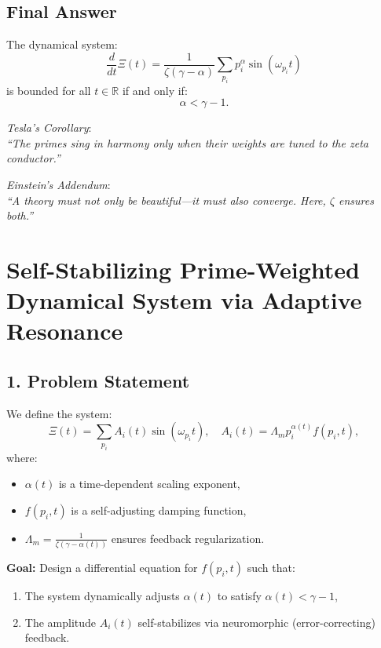 \documentclass{article}
\theoremstyle{plain}
\theoremstyle{claimstyle}
\begin{document}
\subsection*{Final Answer}

The dynamical system:
\[
\frac{d}{dt} \Xi(t) = \frac{1}{\zeta(\gamma - \alpha)} \sum_{p_i} p_i^\alpha \sin(\omega_{p_i} t)
\]
is bounded for all \( t \in \mathbb{R} \) if and only if:
\[
\boxed{\alpha < \gamma - 1}.
\]

\vspace{1em}
\textit{Tesla’s Corollary}: \\
\emph{``The primes sing in harmony only when their weights are tuned to the zeta conductor.''}

\vspace{0.5em}
\textit{Einstein’s Addendum}: \\
\emph{``A theory must not only be beautiful—it must also converge. Here, \( \zeta \) ensures both.''}

\section{Self-Stabilizing Prime-Weighted Dynamical System via Adaptive Resonance}

\subsection*{1. Problem Statement}

We define the system:
\[
\Xi(t) = \sum_{p_i} A_i(t) \sin(\omega_{p_i} t), \quad A_i(t) = \Lambda_m p_i^{\alpha(t)} f(p_i, t),
\]
where:
\begin{itemize}
    \item \( \alpha(t) \) is a time-dependent scaling exponent,
    \item \( f(p_i, t) \) is a self-adjusting damping function,
    \item \( \Lambda_m = \frac{1}{\zeta(\gamma - \alpha(t))} \) ensures feedback regularization.
\end{itemize}

\textbf{Goal:} Design a differential equation for \( f(p_i, t) \) such that:
\begin{enumerate}
    \item The system dynamically adjusts \( \alpha(t) \) to satisfy \( \alpha(t) < \gamma - 1 \),
    \item The amplitude \( A_i(t) \) self-stabilizes via neuromorphic (error-correcting) feedback.
\end{enumerate}
\end{document}
